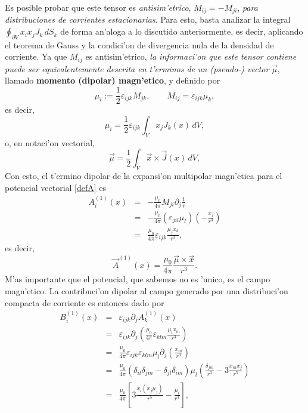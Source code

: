 Es posible probar que este tensor es \textit{antisim'etrico},
$M_{ij}=-M_{ji}$, \textit{para distribuciones de corrientes estacionarias}. Para esto,
basta analizar la integral $\oint_{\partial V}x_i x_j J_k\,dS_k$ de forma
an'aloga a lo discutido anteriormente, es decir, aplicando el teorema de Gauss y la
condici'on de divergencia nula de la densidad de corriente. Ya que $M_{ij}$ es
antisim'etrico, \textit{la informaci'on que este tensor contiene puede ser
equivalentemente descrita en t'erminos de un (pseudo-) vector} $\vec{\mu}$,
llamado \textbf{momento (dipolar) magn'etico}, y definido por
\begin{equation}
 \mu_i:=\frac{1}{2}\varepsilon_{ijk}M_{jk}, \qquad
M_{ij}=\varepsilon_{ijk}\mu_k, \label{vmdm}
\end{equation}
es decir,
\begin{equation}
 \boxed{\mu_i=\frac{1}{2}\varepsilon_{ijk}\int_V x_j J_k(x)\, dV,}
\end{equation}
o, en notaci'on vectorial, 
\begin{equation}
 \boxed{\vec{\mu}=\frac{1}{2}\int_V \vec{x}\times\vec{J}(x)\,dV,}
\end{equation}
Con esto, el t'ermino dipolar de la expansi'on multipolar magn'etica para el
potencial vectorial \eqref{defA} es
\begin{eqnarray}
 A_i^{(1)}(x)&=&-\frac{\mu_0}{4\pi}M_{ji}\partial_j\frac{1}{r} \\
&=&-\frac{\mu_0}{4\pi}\left(\varepsilon_{jil}\mu_l\right)\left(-\frac{x_j}{
r^3}\right) \\
&=&\frac{\mu_0}{4\pi}\varepsilon_{ijk}\frac{\mu_jx_k}{r^3},
\end{eqnarray}
es decir,
\begin{equation}
 \boxed{\vec{A}^{(1)}(x)=\frac{\mu_0}{4\pi}\frac{\vec{\mu}\times\vec{x}}{r^3}.}
\label{Adip}
\end{equation}
M'as importante que el potencial, que sabemos no es 'unico, es el campo
magn'etico. La contribuci'on dipolar al campo generado por una distribuci'on
compacta de corriente es entonces dado por
\begin{eqnarray}
B_i^{(1)}(x)&=&\varepsilon_{ijk}\partial_jA_k^{(1)}(x)\\
&=&\varepsilon_{ijk}\partial_j\left(\frac{\mu_0}{4\pi}\varepsilon_{klm}\frac{
\mu_lx_m}{r^3}\right) \\
&=&\frac{\mu_0}{4\pi}\varepsilon_{ijk}\varepsilon_{klm}\mu_l\partial_j\left(
\frac{x_m}{r^3}\right) \\
&=&\frac{\mu_0}{4\pi}\left(\delta_{il}\delta_{jm}-\delta_{jl}\delta_{im}\right)
\mu_l\left(\frac{\delta_{jm}}{r^3}-3\frac{x_mx_j}{r^5}\right) \\
&=&\frac{\mu_0}{4\pi}\left[3\frac{x_i(x_j\mu_j)}{r^5}-\frac{\mu_i}{r^3}
\right] ,
\end{eqnarray}
